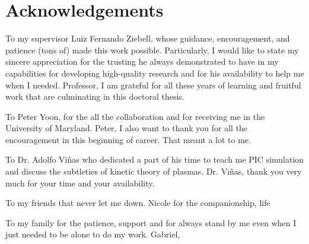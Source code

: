 \pagestyle{empty}
\chapter*{Acknowledgements}
To my supervisor Luiz Fernando Ziebell, whose guidance, encouragement,
and patience (tons of) made this work possible. Particularly, I would
like to state my sincere appreciation for the trusting he always
demonstrated to have in my capabilities for developing high-quality
research and for his availability to help me when I needed. Professor,
I am grateful for all these years of learning and fruitful work that
are culminating in this doctoral thesis.

To Peter Yoon, for the all the collaboration and for receiving me in
the University of Maryland. Peter, I also want to thank you for all
the encouragement in this beginning of career. That meant a lot to me.

To Dr. Adolfo Viñas who dedicated a part of his time to teach me PIC
simulation and discuss the subtleties of kinetic theory of plasmas.
Dr. Viñas, thank you very much for your time and your availability.

To my friends that never let me down. Nicole for the companionship, life 

To my family for the patience, support and for always stand by me even
when I just needed to be alone to do my work. Gabriel, 
  
  

  
  
  


